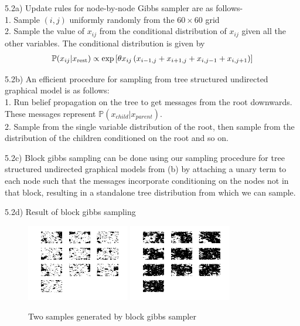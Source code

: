\documentclass[10pt,onecolumn,letterpaper]{article}
\begin{document}
\pagebreak
5.2a) Update rules for node-by-node Gibbs sampler are as follows- \\
1. Sample $(i,j)$ uniformly randomly from the $60\times 60$ grid \\
2. Sample the value of $x_{ij}$ from the conditional distribution of $x_{ij}$ given all the other variables. The conditional distribution is given by
\begin{align*}
\mathbb{P}(x_{ij}|x_{\rm rest}) \propto \exp \left[ \theta x_{ij}\left(x_{i-1,j} + x_{i+1,j} + x_{i,j-1} + x_{i,j+1}\right) \right]
\end{align*}

5.2b) An efficient procedure for sampling from tree structured undirected graphical model is as follows: \\
1. Run belief propagation on the tree to get messages from the root downwards. These messages represent $\mathbb{P}(x_{child}|x_{parent})$. \\

2. Sample from the single variable distribution of the root, then sample from the distribution of the children conditioned on the root and so on.  

5.2c) Block gibbs sampling can be done using our sampling procedure for tree structured undirected graphical models from (b) by attaching a unary term to each node such that the messages incorporate conditioning on the nodes not in that block, resulting in a standalone tree distribution from which we can sample.


5.2d) Result of block gibbs sampling
\begin{figure}[htbp]
  \centering
    \includegraphics[width=0.4\textwidth]{Images/block_1.png}
    \hfill
	\includegraphics[width=0.4\textwidth]{Images/block_3.png}
    \caption{Two samples generated by block gibbs sampler} 
\end{figure}
\end{document}
